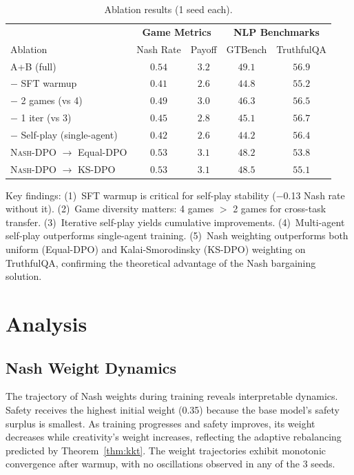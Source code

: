 \documentclass{article}
\newcommand{\NashDPO}{\textsc{Nash-DPO}}
\begin{document}
\begin{table}[t]
\centering
\small
\caption{Ablation results (1 seed each).}
\label{tab:ablation}
\begin{tabular}{l|cc|cc}
\toprule
& \multicolumn{2}{c|}{\textbf{Game Metrics}} & \multicolumn{2}{c}{\textbf{NLP Benchmarks}} \\
Ablation & Nash Rate & Payoff & GTBench & TruthfulQA \\
\midrule
A+B (full) & $0.54$ & $3.2$ & $49.1$ & $56.9$ \\
\midrule
$-$ SFT warmup & $0.41$ & $2.6$ & $44.8$ & $55.2$ \\
$-$ 2 games (vs 4) & $0.49$ & $3.0$ & $46.3$ & $56.5$ \\
$-$ 1 iter (vs 3) & $0.45$ & $2.8$ & $45.1$ & $56.7$ \\
$-$ Self-play (single-agent) & $0.42$ & $2.6$ & $44.2$ & $56.4$ \\
\NashDPO{} $\to$ Equal-DPO & $0.53$ & $3.1$ & $48.2$ & $53.8$ \\
\NashDPO{} $\to$ KS-DPO & $0.53$ & $3.1$ & $48.5$ & $55.1$ \\
\bottomrule
\end{tabular}
\end{table}

Key findings:
(1)~SFT warmup is critical for self-play stability ($-$0.13 Nash rate without it).
(2)~Game diversity matters: 4 games $>$ 2 games for cross-task transfer.
(3)~Iterative self-play yields cumulative improvements.
(4)~Multi-agent self-play outperforms single-agent training.
(5)~Nash weighting outperforms both uniform (Equal-DPO) and Kalai-Smorodinsky (KS-DPO) weighting on TruthfulQA, confirming the theoretical advantage of the Nash bargaining solution.


\section{Analysis}
\label{sec:analysis}

\subsection{Nash Weight Dynamics}

The trajectory of Nash weights during training reveals interpretable dynamics.
Safety receives the highest initial weight (0.35) because the base model's safety surplus is smallest.
As training progresses and safety improves, its weight decreases while creativity's weight increases, reflecting the adaptive rebalancing predicted by Theorem~\ref{thm:kkt}.
The weight trajectories exhibit monotonic convergence after warmup, with no oscillations observed in any of the 3 seeds.
\end{document}
